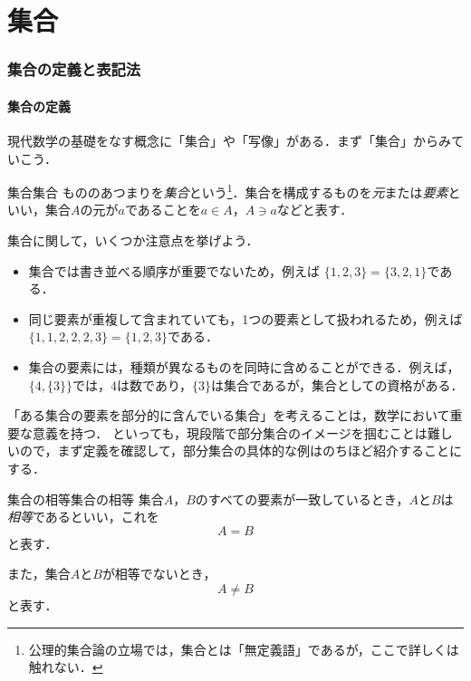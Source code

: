 \part*{集合}
\section{集合の定義と表記法}

\subsection{集合の定義}

現代数学の基礎をなす概念に「集合」や「写像」がある．まず「集合」からみていこう．
\begin{definition}{集合}{集合}
  もののあつまりを\emph{集合}という\footnote{公理的集合論の立場では，集合とは「無定義語」であるが，ここで詳しくは触れない．}．集合を構成するものを\emph{元}または\emph{要素}といい，集合$A$の元が$a$であることを$a \in A$，$A \ni a$などと表す．
\end{definition}

集合に関して，いくつか注意点を挙げよう．

\begin{itemize}
  \item 集合では書き並べる順序が重要でないため，例えば $\{1, 2, 3\} = \{3, 2, 1\}$である．
  \item 同じ要素が重複して含まれていても，1つの要素として扱われるため，例えば$\{1, 1, 2, 2, 2, 3\} = \{1, 2, 3\}$である．
  \item 集合の要素には，種類が異なるものを同時に含めることができる．例えば，$\{4, \{3\}\}$では，$4$は数であり，$\{3\}$は集合であるが，集合としての資格がある．
\end{itemize}

「ある集合の要素を部分的に含んでいる集合」を考えることは，数学において重要な意義を持つ．
といっても，現段階で部分集合のイメージを掴むことは難しいので，まず定義を確認して，部分集合の具体的な例はのちほど紹介することにする．

\begin{definition}{集合の相等}{集合の相等}
  集合$A$，$B$のすべての要素が一致しているとき，$A$と$B$は\emph{相等}であるといい，これを
  \[
    A = B
  \]
  と表す．

  また，集合$A$と$B$が相等でないとき，
  \[
    A \ne B
  \]
  と表す．
\end{definition}

